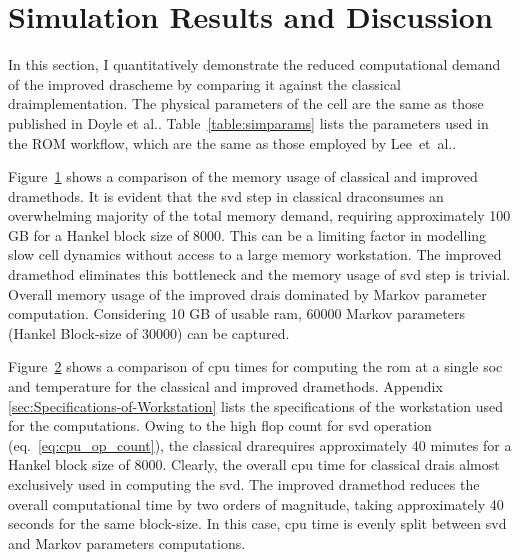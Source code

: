 \section{Simulation Results and Discussion\label{sec:Results} }

In this section, I quantitatively demonstrate the reduced computational
demand of the improved \gls{dra}scheme by comparing it against the classical
\gls{dra}implementation. The physical parameters of the cell are the same
as those published in Doyle et al.\cite{FullerDoyleNewman1994}.
Table~\ref{table:simparams} lists the parameters used in the ROM
workflow, which are the same as those employed by Lee~et~al.\cite{LeeChemistruckPlett2012}.

\begin{figure}
	\caption{}
	\label{memory}
\end{figure}

Figure~\ref{memory} shows a comparison of the memory usage of
classical and improved \gls{dra}methods. It is evident that the \gls{svd} step
in classical \gls{dra}consumes an overwhelming majority of the total memory
demand, requiring approximately 100 GB for a Hankel block size of
8000. This can be a limiting factor in modelling slow cell dynamics
without access to a large memory workstation. The improved \gls{dra}method
eliminates this bottleneck and the memory usage of \gls{svd} step is trivial.
Overall memory usage of the improved \gls{dra}is dominated by Markov parameter
computation. Considering 10 GB of usable \gls{ram}, 60000 Markov parameters
(Hankel Block-size of 30000) can be captured.

Figure~\ref{cputime} shows a comparison of \gls{cpu} times for computing
the \gls{rom} at a single \gls{soc} and temperature for the classical and improved
\gls{dra}methods. Appendix \ref{sec:Specifications-of-Workstation} lists the specifications
of the workstation used for the computations. Owing to the high flop
count for \gls{svd} operation (eq.~\ref{eq:cpu_op_count}), the classical
\gls{dra}requires approximately 40 minutes for a Hankel block size of 8000.
Clearly, the overall \gls{cpu} time for classical \gls{dra}is almost exclusively
used in computing the \gls{svd}. The improved \gls{dra}method reduces the overall
computational time by two orders of magnitude, taking approximately
40 seconds for the same block-size. In this case, \gls{cpu} time is evenly
split between \gls{svd} and Markov parameters computations.

\begin{figure}
	\caption{}
	\label{cputime}
\end{figure}

